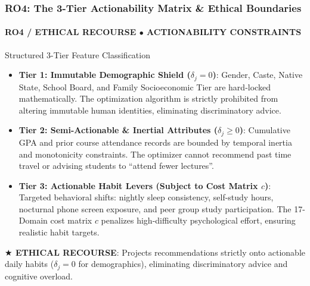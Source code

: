 \documentclass[aspectratio=169, 10pt]{beamer}
\newcommand{\leadbullet}[2]{\textbf{\color{NavyDark}#1}: \color{TextBody}#2}
\begin{document}
\begin{frame}
  \frametitle{RO4: The 3-Tier Actionability Matrix \& Ethical Boundaries}
  \framesubtitle{RO4 / ETHICAL RECOURSE $\bullet$ ACTIONABILITY CONSTRAINTS}

  \begin{defensecard}{Structured 3-Tier Feature Classification}
    \begin{itemize}\setlength{\itemsep}{3pt}\setlength{\parskip}{0pt}\fontsize{8.5pt}{10.8pt}\selectfont
      \item \leadbullet{Tier 1: Immutable Demographic Shield ($\delta_j = 0$)}{Gender, Caste, Native State, School Board, and Family Socioeconomic Tier are hard-locked mathematically. The optimization algorithm is strictly prohibited from altering immutable human identities, eliminating discriminatory advice.}
      \item \leadbullet{Tier 2: Semi-Actionable \& Inertial Attributes ($\delta_j \ge 0$)}{Cumulative GPA and prior course attendance records are bounded by temporal inertia and monotonicity constraints. The optimizer cannot recommend past time travel or advising students to ``attend fewer lectures''.}
      \item \leadbullet{Tier 3: Actionable Habit Levers (Subject to Cost Matrix $c$)}{Targeted behavioral shifts: nightly sleep consistency, self-study hours, nocturnal phone screen exposure, and peer group study participation. The 17-Domain cost matrix $c$ penalizes high-difficulty psychological effort, ensuring realistic habit targets.}
    \end{itemize}
  \end{defensecard}
  \vspace{-0.1cm}

  \begin{takeawaybanner}
    \textbf{\color{GoldPill}$\bigstar$ ETHICAL RECOURSE}: Projects recommendations strictly onto actionable daily habits ($\delta_j = 0$ for demographics), eliminating discriminatory advice and cognitive overload.
  \end{takeawaybanner}
\end{frame}
\end{document}
